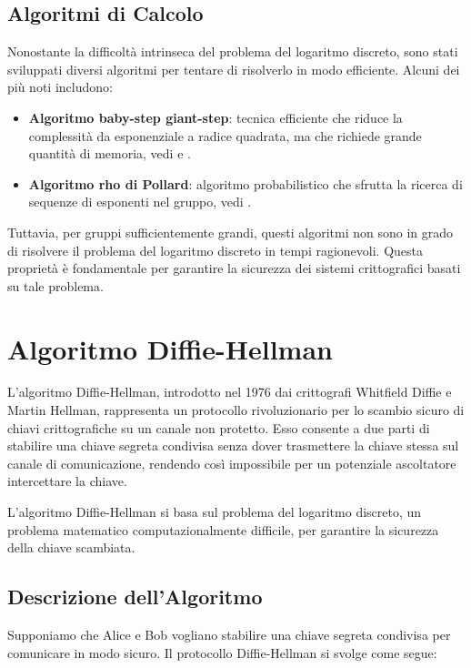 \documentclass[a4paper,12pt]{report}
\begin{document}
\section{Algoritmi di Calcolo}
Nonostante la difficoltà intrinseca del problema del logaritmo discreto, sono stati sviluppati diversi algoritmi per tentare di risolverlo in modo efficiente. Alcuni dei più noti includono:
\begin{itemize}
    \item \textbf{Algoritmo baby-step giant-step}: tecnica efficiente che riduce la complessità da esponenziale a radice quadrata, ma che richiede grande quantità di memoria, vedi \cite{silverman2009elliptic} e \cite{coron2011baby}.
    \item \textbf{Algoritmo rho di Pollard}: algoritmo probabilistico che sfrutta la ricerca di sequenze di esponenti nel gruppo, vedi \cite{nickerson2020collision}.
\end{itemize}

Tuttavia, per gruppi sufficientemente grandi, questi algoritmi non sono in grado di risolvere il problema del logaritmo discreto in tempi ragionevoli. Questa proprietà è fondamentale per garantire la sicurezza dei sistemi crittografici basati su tale problema.
%
%
%
%
%
%
%
%
%
%
%
%
%
%
\chapter{Algoritmo Diffie-Hellman}
L'algoritmo Diffie-Hellman, introdotto nel 1976 dai crittografi Whitfield Diffie e Martin Hellman, rappresenta un protocollo rivoluzionario per lo scambio sicuro di chiavi crittografiche su un canale non protetto. Esso consente a due parti di stabilire una chiave segreta condivisa senza dover trasmettere la chiave stessa sul canale di comunicazione, rendendo così impossibile per un potenziale ascoltatore intercettare la chiave.

L'algoritmo Diffie-Hellman si basa sul problema del logaritmo discreto, un problema matematico computazionalmente difficile, per garantire la sicurezza della chiave scambiata.

\section{Descrizione dell'Algoritmo}

Supponiamo che Alice e Bob vogliano stabilire una chiave segreta condivisa per comunicare in modo sicuro. Il protocollo Diffie-Hellman si svolge come segue:
\end{document}
